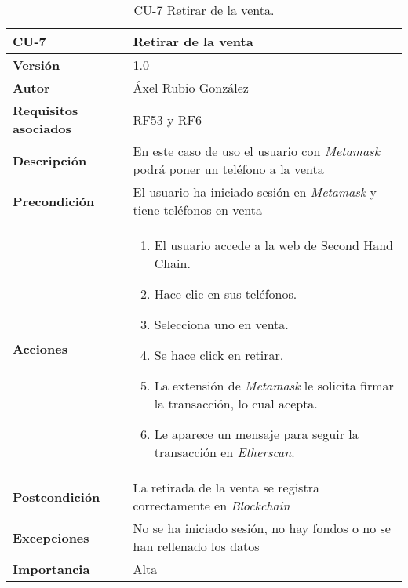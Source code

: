 \begin{table}[p]
	\centering
	\begin{tabularx}{\linewidth}{ p{} p{} }
		\toprule
		\textbf{CU-7}    & \textbf{Retirar de la venta}\\
		\toprule
		\textbf{Versión}              & 1.0    \\
		\textbf{Autor}                & Áxel Rubio González \\
		\textbf{Requisitos asociados} & RF53 y RF6 \\
		\textbf{Descripción}          & En este caso de uso el usuario con \textit{Metamask} podrá poner un teléfono a la venta  \\
		\textbf{Precondición}         & El usuario ha iniciado sesión en \textit{Metamask} y tiene teléfonos en venta \\
		\textbf{Acciones}             &
		\begin{enumerate}
			\def\labelenumi{\arabic{enumi}.}
			\tightlist
			\item El usuario accede a la web de Second Hand Chain.
			\item Hace clic en sus teléfonos.
                \item Selecciona uno en venta.
                \item Se hace click en retirar.
                \item La extensión de \textit{Metamask} le solicita firmar la transacción, lo cual acepta.
                \item Le aparece un mensaje para seguir la transacción en \textit{Etherscan}.
		\end{enumerate}\\
		\textbf{Postcondición}        & La retirada de la venta se registra correctamente en \textit{Blockchain} \\
		\textbf{Excepciones}          & No se ha iniciado sesión, no hay fondos o no se han rellenado los datos \\
		\textbf{Importancia}          & Alta \\
		\bottomrule
	\end{tabularx}
	\caption{CU-7 Retirar de la venta.}
\end{table}

